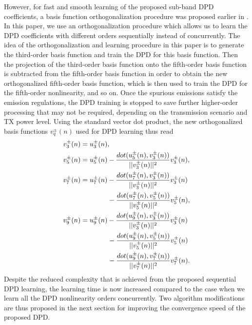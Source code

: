 However, for fast and smooth learning of the proposed sub-band DPD coefficients, a basis function orthogonalization procedure was proposed earlier in \cite{TMTT_SubbandDPD}. 
In this paper, we use an orthogonalization procedure which allows us to learn the DPD coefficients with different orders sequentially instead of concurrently. 
The idea of the orthogonalization and learning procedure in this paper is to generate the third-order basis function and train the DPD for this basis function. 
Then the projection of the third-order basis function onto the fifth-order basis function is subtracted from the fifth-order basis function in order to obtain the new orthogonalized fifth-order basis function, which is then used to train the DPD for the fifth-order nonlinearity, and so on. 
Once the spurious emissions satisfy the emission regulations, the DPD training is stopped to save further higher-order processing that may not be required, depending on the transmission scenario and TX power level. 
Using the standard vector dot product, the new orthogonalized basis functions $v^\pm_q(n)$ used for DPD learning thus read
\begin{align}
\small
v^\pm_3(n) &= u^\pm_3(n), \label{eq:IM3_OrthBasis_1} \\
v^\pm_5(n) &= u^\pm_5(n) - \frac{dot(u^\pm_5(n),v^\pm_3(n))}{||v^\pm_3(n)||^2} v^\pm_3(n), \label{eq:IM3_OrthBasis_2} \\
v^\pm_7(n) &= u^\pm_7(n)   - \frac{dot(u^\pm_7(n),v^\pm_3(n))}{||v^\pm_3(n)||^2} v^\pm_3(n) \nonumber\\
&\:\:\:\:\:\:\:\:\:\:\:\:\:\:\:\:\:\: - \frac{dot(u^\pm_7(n),v^\pm_5(n))}{||v^\pm_5(n)||^2} v^\pm_5(n), \label{eq:IM3_OrthBasis_3}\\
v^\pm_9(n) &= u^\pm_9(n) - \frac{dot(u^\pm_9(n),v^\pm_3(n))}{||v^\pm_3(n)||^2} v^\pm_3(n) \nonumber\\
&\:\:\:\:\:\:\:\:\:\:\:\:\:\:\:\:\:\: - \frac{dot(u^\pm_9(n),v^\pm_5(n))}{||v^\pm_5(n)||^2} v^\pm_5(n) \nonumber\\ 
&\:\:\:\:\:\:\:\:\:\:\:\:\:\:\:\:\:\:	- \frac{dot(u^\pm_9(n),v^\pm_7(n))}{||v^\pm_7(n)||^2} v^\pm_7(n). \label{eq:IM3_OrthBasis_4}
\end{align}
\normalsize
Despite the reduced complexity that is achieved from the proposed sequential DPD learning, the learning time is now increased compared to the case when we learn all the DPD nonlinearity orders concurrently. 
Two algorithm modifications are thus proposed in the next section for improving the convergence speed of the proposed DPD.

